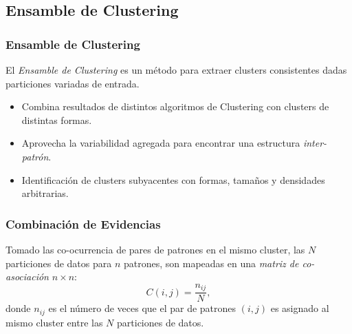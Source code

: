 \subsection{Ensamble de Clustering}
\begin{frame}
	\frametitle{Ensamble de Clustering}
	\begin{tcolorbox}[colback=blue!5,colframe=blue!40!black,title=Ensamble de Clustering]
		El \textit{Ensamble de Clustering} es un método para extraer clusters consistentes dadas particiones variadas de entrada.
	\end{tcolorbox}

 	\bigskip

	\begin{itemize}
		\item Combina resultados de distintos algoritmos de Clustering con clusters de distintas formas.
		\item Aprovecha la variabilidad agregada para encontrar una estructura \textit{inter-patrón}.
		\item Identificación de clusters subyacentes con formas, tamaños y densidades arbitrarias.
	\end{itemize}
\end{frame}

\begin{frame}
	\frametitle{Combinación de Evidencias}
	Tomado las co-ocurrencia de pares de patrones en el mismo cluster, las \(N\) particiones de datos para \(n\) patrones, son mapeadas en una \textit{matriz de co-asociación} \(n \times n\):
	\medskip
	\[C(i,j)=\frac{n_{ij}}{N},\]
	\medskip
	donde \(n_{ij}\) es el número de veces que el par de patrones \((i,j)\) es asignado al mismo cluster entre las \(N\) particiones de datos.
\end{frame}
